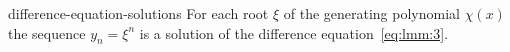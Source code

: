\begin{Lemma}{difference-equation-solutions}
  For each root $\xi$ of the generating polynomial $\chi(x)$ the
  sequence $y_n = \xi^n$ is a solution of the difference
  equation~\eqref{eq:lmm:3}.
\end{Lemma}


